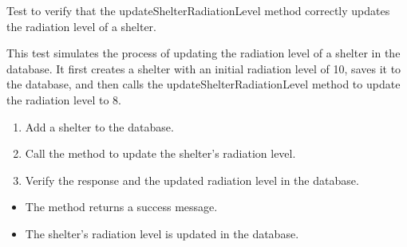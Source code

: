 \documentclass[letterpaper,10pt,english]{sphinxmanual}
\begin{document}
\begin{fulllineitems}
\label{\detokenize{test:test.test_shelter.test_updateShelterRadiationLevel_success}}
\pysigstartsignatures
\pysiglinewithargsret
{}
{}
{}
\pysigstopsignatures
\sphinxAtStartPar
Test to verify that the updateShelterRadiationLevel method correctly updates the radiation level of a shelter.

\sphinxAtStartPar
This test simulates the process of updating the radiation level of a shelter in the database.
It first creates a shelter with an initial radiation level of 10, saves it to the database, and then
calls the updateShelterRadiationLevel method to update the radiation level to 8.
\begin{description}
\begin{enumerate}
%
\item {} 
\sphinxAtStartPar
Add a shelter to the database.

\item {} 
\sphinxAtStartPar
Call the  method to update the shelter’s radiation level.

\item {} 
\sphinxAtStartPar
Verify the response and the updated radiation level in the database.

\end{enumerate}

\begin{itemize}
\item {} 
\sphinxAtStartPar
The method returns a success message.

\item {} 
\sphinxAtStartPar
The shelter’s radiation level is updated in the database.

\end{itemize}

\end{description}

\end{fulllineitems}

\end{document}
